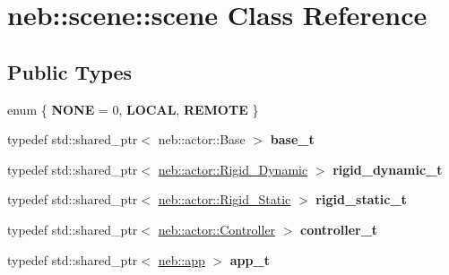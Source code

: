 \hypertarget{classneb_1_1scene_1_1scene}{
\section{neb::scene::scene Class Reference}
\label{classneb_1_1scene_1_1scene}
}
\subsection*{Public Types}
\begin{DoxyCompactItemize}
\item 
enum \{ {\bfseries NONE} =  0, 
{\bfseries LOCAL}, 
{\bfseries REMOTE}
 \}
\item 
\hypertarget{classneb_1_1scene_1_1scene_a12a166d302ebe2c0ccc39c97d8dcd58b}{
typedef std::shared\_\-ptr$<$ neb::actor::Base $>$ {\bfseries base\_\-t}}
\label{classneb_1_1scene_1_1scene_a12a166d302ebe2c0ccc39c97d8dcd58b}

\item 
\hypertarget{classneb_1_1scene_1_1scene_a102a6dc3de38eda425650b9122676a78}{
typedef std::shared\_\-ptr$<$ \hyperlink{classneb_1_1actor_1_1Rigid__Dynamic}{neb::actor::Rigid\_\-Dynamic} $>$ {\bfseries rigid\_\-dynamic\_\-t}}
\label{classneb_1_1scene_1_1scene_a102a6dc3de38eda425650b9122676a78}

\item 
\hypertarget{classneb_1_1scene_1_1scene_a782cb687dc9d61c8fcd5b12aa4189487}{
typedef std::shared\_\-ptr$<$ \hyperlink{classneb_1_1actor_1_1Rigid__Static}{neb::actor::Rigid\_\-Static} $>$ {\bfseries rigid\_\-static\_\-t}}
\label{classneb_1_1scene_1_1scene_a782cb687dc9d61c8fcd5b12aa4189487}

\item 
\hypertarget{classneb_1_1scene_1_1scene_a4d26816606556e2642a49ba31d10e6e3}{
typedef std::shared\_\-ptr$<$ \hyperlink{classneb_1_1actor_1_1Controller}{neb::actor::Controller} $>$ {\bfseries controller\_\-t}}
\label{classneb_1_1scene_1_1scene_a4d26816606556e2642a49ba31d10e6e3}

\item 
\hypertarget{classneb_1_1scene_1_1scene_a91d267e955478e0ae15693eb49103e3c}{
typedef std::shared\_\-ptr$<$ \hyperlink{classneb_1_1app}{neb::app} $>$ {\bfseries app\_\-t}}
\label{classneb_1_1scene_1_1scene_a91d267e955478e0ae15693eb49103e3c}

\end{DoxyCompactItemize}
